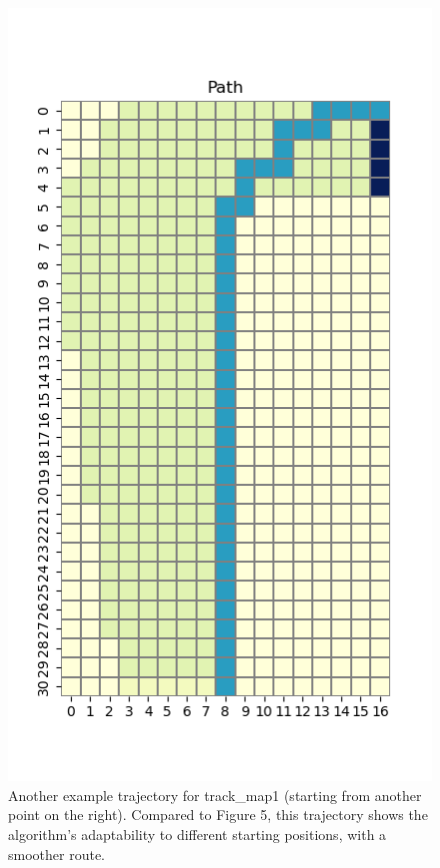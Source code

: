 \documentclass{article}
\begin{document}
\begin{figure}[h]
\begin{minipage}{0.48\textwidth}
    \end{minipage}
    \hfill
    \begin{minipage}{0.48\textwidth}
        \includegraphics[width=\textwidth]{grid1_4.png}
        \caption{Another example trajectory for track\_map1 (starting from another point on the right). Compared to Figure 5, this trajectory shows the algorithm's adaptability to different starting positions, with a smoother route.}
    \end{minipage}
\end{figure}
\end{document}
